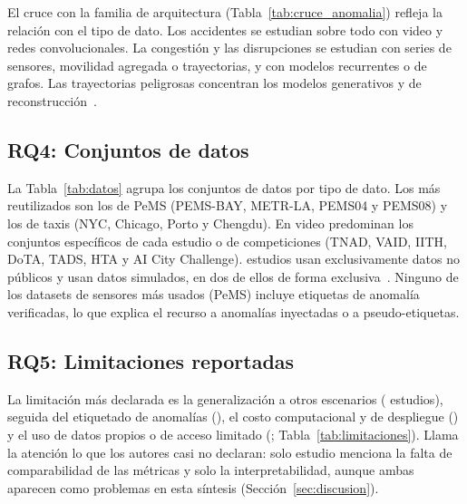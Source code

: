 \documentclass[12pt, a4paper]{article}
\begin{document}


El cruce con la familia de arquitectura (Tabla~\ref{tab:cruce_anomalia}) refleja la relaci\'{o}n con el tipo de dato. Los accidentes se estudian sobre todo con video y redes convolucionales. La congesti\'{o}n y las disrupciones se estudian con series de sensores, movilidad agregada o trayectorias, y con modelos recurrentes o de grafos. Las trayectorias peligrosas concentran los modelos generativos y de reconstrucci\'{o}n~\cite{chakraborty2023structural,wang2024multiscale}.



\subsection{RQ4: Conjuntos de datos}

La Tabla~\ref{tab:datos} agrupa los conjuntos de datos por tipo de dato. Los m\'{a}s reutilizados son los de PeMS (PEMS-BAY, METR-LA, PEMS04 y PEMS08) y los de taxis (NYC, Chicago, Porto y Chengdu). En video predominan los conjuntos espec\'{i}ficos de cada estudio o de competiciones (TNAD, VAID, IITH, DoTA, TADS, HTA y AI City Challenge). \NdatasetPropio{} estudios usan exclusivamente datos no p\'{u}blicos y \NdatosSimuladosAny{} usan datos simulados, en dos de ellos de forma exclusiva~\cite{chakraborty2023structural,park2025graph}. Ninguno de los datasets de sensores m\'{a}s usados (PeMS) incluye etiquetas de anomal\'{i}a verificadas, lo que explica el recurso a anomal\'{i}as inyectadas o a pseudo-etiquetas.



\subsection{RQ5: Limitaciones reportadas}

La limitaci\'{o}n m\'{a}s declarada es la generalizaci\'{o}n a otros escenarios (\Nlimgeneralizacion{} estudios), seguida del etiquetado de anomal\'{i}as (\Nlimetiquetado), el costo computacional y de despliegue (\Nlimcostodespliegue) y el uso de datos propios o de acceso limitado (\Nlimdatosreplicabilidad{}; Tabla~\ref{tab:limitaciones}). Llama la atenci\'{o}n lo que los autores casi no declaran: solo \Nlimmetricasnouniformes{} estudio menciona la falta de comparabilidad de las m\'{e}tricas y solo \Nliminterpretabilidad{} la interpretabilidad, aunque ambas aparecen como problemas en esta s\'{i}ntesis (Secci\'{o}n~\ref{sec:discusion}).
\end{document}
